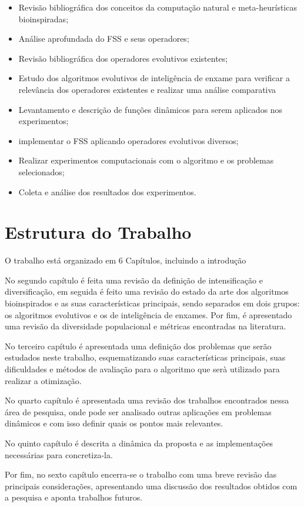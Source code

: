 \begin{itemize}
\item Revisão bibliográfica dos conceitos da computação natural e meta-heurísticas bioinspiradas;
\item Análise aprofundada do FSS e seus operadores;
\item Revisão bibliográfica dos operadores evolutivos existentes;
\item Estudo dos algoritmos evolutivos de inteligência de enxame para verificar a relevância dos operadores existentes e realizar uma análise comparativa
\item Levantamento e descrição de funções dinâmicos para serem aplicados nos experimentos;
\item implementar o FSS aplicando operadores evolutivos diversos;
\item Realizar experimentos computacionais com o algoritmo e os problemas selecionados;
\item Coleta e análise dos resultados dos experimentos.
\end{itemize} 

\section{Estrutura do Trabalho}
\label{sec:escopo}

O trabalho está organizado em 6 Capítulos, incluindo a introdução

No segundo capítulo é feita uma revisão da definição de intensificação e diversificação, em seguida é feito uma revisão do estado da arte dos algoritmos bioinspirados e as suas características principais, sendo separados em dois grupos: os algoritmos evolutivos e os de inteligência de enxames. Por fim, é apresentado uma revisão da diversidade populacional e métricas encontradas na literatura.

No terceiro capítulo é apresentada uma definição dos problemas que serão estudados neste trabalho, esquematizando suas características principais, suas dificuldades e métodos de avaliação para o algoritmo que serà utilizado para realizar a otimização.

No quarto capítulo é apresentada uma revisão dos trabalhos encontrados nessa área de pesquisa, onde pode ser analisado outras aplicações em problemas dinâmicos e com isso definir quais os pontos mais relevantes.

No quinto capítulo é descrita a dinâmica da proposta e as implementações necessárias para concretiza-la.

Por fim, no sexto capítulo encerra-se o trabalho com uma breve revisão das principais considerações, apresentando uma discussão dos resultados obtidos com a pesquisa e aponta trabalhos futuros.